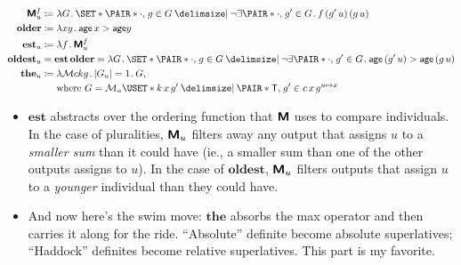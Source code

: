 \documentclass[10pt,fleqn]{article}
\newcommand{\M}{\text{\sffamily\bfseries M}}
\begin{document}
\begin{minipage}[t]{0.5\textwidth} %
\begin{spreadlines}{0pt}
\begin{align*}
  \M_u^f &\coloneq
  \l G \dt
    \set{%
      \pair{\cdot}{g} \in G
    \giv
      \neg\exists\pair{\cdot}{g'} \in G \dt f\,(g'\,u)\,(g\,u)
    } \\
  \textbf{older} &\coloneq
    \l xy \dt \cn{age}\,x > \cn{age}y \\
  \textbf{est}_u &\coloneq
  \l f \dt \M_u^f \\
  \textbf{oldest}_u &=
  \textbf{est}\,\textbf{older} =
  \l G \dt
    \set{%
      \pair{\cdot}{g} \in G
    \giv
      \neg\exists\pair{\cdot}{g'} \in G \dt \cn{age}\,(g'\,u) > \cn{age}\,(g\,u)
    } \\
  \textbf{the}_u &\coloneq
  \l \mathcal{M}ckg \dt |G_u| = 1 \dt G, \\
  &\hphantom{{}\coloneq{}}
    \text{where}\ 
    G = \mathcal{M}_u\uset{%
      k\,x\,g'
    \giv
      \pair{\cn{T}}{g'} \in c\,x\,g^{u\mapsto x}
    }
\end{align*}
\end{spreadlines}
\end{minipage}
%
%
\begin{minipage}[t]{0.5\textwidth} %
\begin{itemize}
  \item
    $\textbf{est}$ abstracts over the ordering function that $\M$ uses to
    compare individuals. In the case of pluralities, $\M_u$ filters away any
    output that assigns $u$ to a \emph{smaller sum} than it could have (ie., a
    smaller sum than one of the other outputs assigns to $u$). In the case of
    $\textbf{oldest}$, $\M_u$ filters outputs that assign $u$ to a
    \emph{younger} individual than they could have.
  \item
    And now here's the swim move: $\textbf{the}$ absorbs the max operator and
    then carries it along for the ride. ``Absolute'' definite become absolute
    superlatives; ``Haddock'' definites become relative superlatives. This
    part is my favorite.
\end{itemize}
\end{minipage}

\dotbreak
\end{document}
